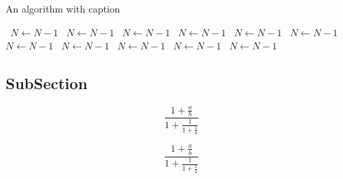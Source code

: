 \documentclass[a4paper]{article}
\begin{document}
\begin{algorithm}
\caption{An algorithm with caption}
\begin{algorithmic}
\    \State $N \gets N - 1$
\    \State $N \gets N - 1$
\    \State $N \gets N - 1$
\    \State $N \gets N - 1$
\    \State $N \gets N - 1$
\    \State $N \gets N - 1$
\    \State $N \gets N - 1$
\    \State $N \gets N - 1$
\    \State $N \gets N - 1$
\    \State $N \gets N - 1$
\    \State $N \gets N - 1$
\EndWhile
\end{algorithmic}
\end{algorithm}

\subsection{SubSection}

\[ \frac{1+\frac{a}{b}}{1+\frac{1}{1+\frac{1}{a}}} \]

\[ \frac{1+\frac{a}{b}}{1+\frac{1}{1+\frac{1}{a}}} \]
\end{document}
